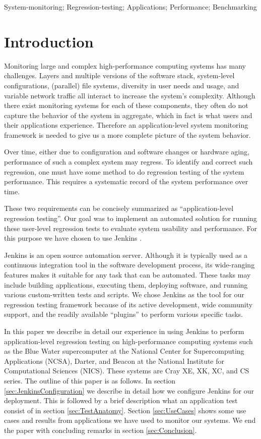 \documentclass[10pt, conference, compsocconf]{IEEEtran}
\begin{document}
\begin{IEEEkeywords}
System-monitoring; Regression-testing; Applications; Performance; Benchmarking
\end{IEEEkeywords}

\section{Introduction}
\label{sec:introduction}

Monitoring large and complex high-performance computing systems has many challenges. 
Layers and multiple versions of the software stack, system-level configurations, (parallel) file systems, diversity in user needs and usage, and variable network traffic all interact to increase the system's complexity. 
Although there exist monitoring systems for each of these components, they often do not capture the behavior of the system in aggregate, which in fact is what users and their applications experience. 
Therefore an application-level system monitoring framework is needed to give us a more complete picture of the system behavior. 
 

Over time, either due to configuration and software changes or hardware aging, performance of such a complex system may regress. 
To identify and correct such regression, one must have some method to do regression testing of the system performance. 
This requires a systematic record of the system performance over time.

These two requirements can be concisely summarized as ``application-level regression testing''. 
Our goal was to implement an automated solution for running these user-level regression tests to evaluate system usability and performance. 
For this purpose we have chosen to use Jenkins \cite{jenkins}.

Jenkins is an open source automation server. 
Although it is typically used as a continuous integration tool in the software development process, its wide-ranging features makes it suitable for any task that can be automated. 
These tasks may include building applications, executing them, deploying software, and running various custom-written tests and scripts. 
We chose Jenkins as the tool for our regression testing framework because of its active development, wide community support, and the readily available ``plugins'' to perform various specific tasks.

In this paper we describe in detail our experience in using Jenkins to perform application-level regression testing on high-performance computing systems such as the Blue Water supercomputer at the National Center for Supercomputing Applications (NCSA), Darter, and Beacon at the National Institute for Computational Sciences (NICS). 
These systems are Cray XE, XK, XC, and CS series. 
The outline of this paper is as follows. In section \ref{sec:JenkinsConfiguration} we describe in detail how we configure Jenkins for our deployment. This is followed by a brief description what an application test consist of in section \ref{sec:TestAnatomy}. Section \ref{sec:UseCases} shows some use cases and results from applications we have used to monitor our systems. We end the paper with concluding remarks in section \ref{sec:Conclusion}.
\end{document}
